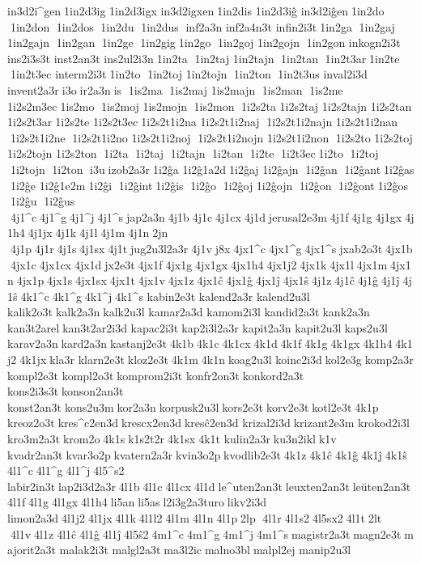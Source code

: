 in3d2i^gen 1in2d3ig 	1in2d3igx 
in3d2igxen 1in2dis  	1in2d3iĝ 
in3d2iĝen 1in2do  1in2don  1in2dos  1in2du  1in2dus  inf2a3n 	inf2a4n3t 	infin2i3t 1in2ga  1in2gaj  	1in2gajn  1in2gan  1in2ge  1in2gig 1in2go  1in2goj  	1in2gojn  1in2gon  
inkogn2i3t 	ins2i3s3t 	inst2an3t 
ins2ul2i3n 1in2ta  1in2taj  	1in2tajn  1in2tan  1in2t3ar 1in2te  1in2t3ec 
interm2i3t 1in2to  1in2toj  	1in2tojn  1in2ton  1in2t3us 	inval2i3d 
invent2a3r i3o ir2a3n is  1is2ma  1is2maj  	1is2majn  1is2man  1is2me  	1i2s2m3ec 1is2mo  1is2moj  	1is2mojn  1is2mon  1i2s2ta  	1i2s2taj  
1i2s2tajn  	1i2s2tan  	1i2s2t3ar 1i2s2te  	1i2s2t3ec 1i2s2t1i2na  
1i2s2t1i2naj  1i2s2t1i2najn  
1i2s2t1i2nan  1i2s2t1i2ne  1i2s2t1i2no  
1i2s2t1i2noj  1i2s2t1i2nojn  
1i2s2t1i2non  1i2s2to  	1i2s2toj  
1i2s2tojn  	1i2s2ton  1i2ta  1i2taj  1i2tajn  1i2tan  1i2te  1i2t3ec 1i2to  1i2toj  1i2tojn  1i2ton  i3u izob2a3r 1i2ĝa  	1i2ĝ1a2d 1i2ĝaj  	1i2ĝajn  1i2ĝan  1i2ĝant 1i2ĝas  1i2ĝe  	1i2ĝ1e2m 1i2ĝi  1i2ĝint 1i2ĝis  1i2ĝo  1i2ĝoj  	1i2ĝojn  1i2ĝon  1i2ĝont 1i2ĝos  1i2ĝu  1i2ĝus  4j1^c 4j1^g 4j1^j 4j1^s jap2a3n 4j1b 4j1c 4j1cx 4j1d jerusal2e3m 4j1f 4j1g 4j1gx 4j1h4 4j1jx 4j1k 4j1l 4j1m 4j1n 2jn  4j1p 4j1r 4j1s 4j1sx 4j1t jug2u3l2a3r 4j1v j8x 4jx1^c 4jx1^g 4jx1^s jxab2o3t 4jx1b 4jx1c 4jx1cx 4jx1d jx2e3t 4jx1f 4jx1g 4jx1gx 4jx1h4 4jx1j2 4jx1k 4jx1l 4jx1m 4jx1n 4jx1p 4jx1s 4jx1sx 4jx1t 4jx1v 4jx1z 4jx1ĉ 4jx1ĝ 4jx1ĵ 4jx1ŝ 4j1z 4j1ĉ 4j1ĝ 4j1ĵ 4j1ŝ 4k1^c 4k1^g 4k1^j 4k1^s 	kabin2e3t 
kalend2a3r 
kalend2u3l 	kalik2o3t kalk2a3n kalk2u3l 	kamar2a3d 	kamom2i3l 
kandid2a3t kank2a3n 
kan3t2arel kan3t2ar2i3d 	kapac2i3t kap2i3l2a3r 	kapit2a3n 	kapit2u3l kaps2u3l 	karav2a3n kard2a3n kastanj2e3t 4k1b 4k1c 4k1cx 4k1d 4k1f 4k1g 4k1gx 4k1h4 4k1j2 4k1jx kla3r 	klarn2e3t kloz2e3t 4k1m 4k1n koag2u3l 	koinc2i3d kol2e3g komp2a3r 	kompl2e3t 	kompl2o3t komprom2i3t 
konfr2on3t konkord2a3t 
kons2i3s3t konson2an3t 
konst2an3t kons2u3m kor2a3n korpusk2u3l kors2e3t korv2e3t kotl2e3t 4k1p 	kreoz2o3t kres^c2en3d krescx2en3d kresĉ2en3d 
krizal2i3d krizant2e3m 
krokod2i3l 	kro3m2a3t krom2o 4k1s k1s2t2r 4k1sx 4k1t 	kulin2a3r ku3n2ikl k1v 
kvadr2an3t kvar3o2p kvatern2a3r kvin3o2p kvodlib2e3t 4k1z 4k1ĉ 4k1ĝ 4k1ĵ 4k1ŝ 4l1^c 4l1^g 4l1^j 4l5^s2 
labir2in3t lap2i3d2a3r 4l1b 4l1c 4l1cx 4l1d le^uten2an3t leuxten2an3t leŭten2an3t 4l1f 4l1g 4l1gx 4l1h4 li5an li5as l2i3g2a3turo likv2i3d 	limon2a3d 4l1j2 4l1jx 4l1k 4l1l2 4l1m 4l1n 4l1p 2lp  4l1r 4l1s2 4l5sx2 4l1t 2lt  4l1v 4l1z 4l1ĉ 4l1ĝ 4l1ĵ 4l5ŝ2 4m1^c 4m1^g 4m1^j 4m1^s magistr2a3t magn2e3t majorit2a3t 	malak2i3t 	malgl2a3t ma3l2ic malno3bl malpl2ej 	manip2u3l 
